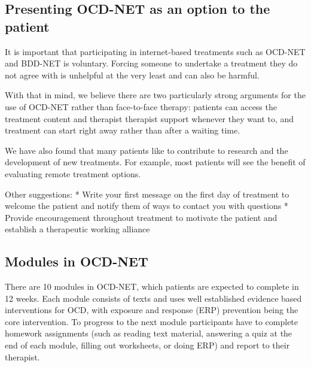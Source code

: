 \documentclass[]{book}
\theoremstyle{definition}
\theoremstyle{definition}
\theoremstyle{definition}
\theoremstyle{remark}
\begin{document}
\hypertarget{presenting-ocd-net-as-an-option-to-the-patient}{%
\subsection{Presenting OCD-NET as an option to the
patient}\label{presenting-ocd-net-as-an-option-to-the-patient}}

It is important that participating in internet-based treatments such as
OCD-NET and BDD-NET is voluntary. Forcing someone to undertake a
treatment they do not agree with is unhelpful at the very least and can
also be harmful.

With that in mind, we believe there are two particularly strong
arguments for the use of OCD-NET rather than face-to-face therapy:
patients can access the treatment content and therapist therapist
support whenever they want to, and treatment can start right away rather
than after a waiting time.

We have also found that many patients like to contribute to research and
the development of new treatments. For example, most patients will see
the benefit of evaluating remote treatment options.

Other suggestions: * Write your first message on the first day of
treatment to welcome the patient and notify them of ways to contact you
with questions * Provide encouragement throughout treatment to motivate
the patient and establish a therapeutic working alliance

\hypertarget{modules-in-ocd-net}{%
\subsection{Modules in OCD-NET}\label{modules-in-ocd-net}}

There are 10 modules in OCD-NET, which patients are expected to complete
in 12 weeks. Each module consists of texts and uses well established
evidence based interventions for OCD, with exposure and response (ERP)
prevention being the core intervention. To progress to the next module
participants have to complete homework assignments (such as reading text
material, answering a quiz at the end of each module, filling out
worksheets, or doing ERP) and report to their therapist.
\end{document}
